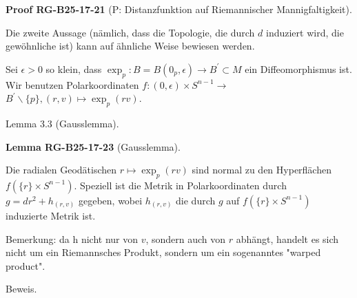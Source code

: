 \documentclass[10pt, letterpaper]{article}
\newcommand{\CustomHeading}[3]{%
  \par\medskip\noindent%
  \textbf{#1 #2} \textnormal{(#3)}.\enskip%
}
\newenvironment{LEM}[2]{\begin{unitbox}\CustomHeading{Lemma}{#1}{#2}}{\end{unitbox}}
\newenvironment{PROOF}[2]{\begin{unitbox}\CustomHeading{Proof}{#1}{#2}}{\end{unitbox}}
\begin{document}
\begin{PROOF}{RG-B25-17-21}{P: Distanzfunktion auf Riemannischer Mannigfaltigkeit}
Die zweite Aussage (nämlich, dass die Topologie, die durch $d$ induziert wird, die gewöhnliche ist) kann auf ähnliche Weise bewiesen werden.

Sei $\epsilon>0$ so klein, dass $\exp _{p}: B=B\left(0_{p}, \epsilon\right) \rightarrow B^{\prime} \subset M$ ein Diffeomorphismus ist. Wir benutzen Polarkoordinaten $f:(0, \epsilon) \times S^{n-1} \rightarrow$ $B^{\prime} \backslash\{p\},(r, v) \mapsto \exp _{p}(r v)$.
\end{PROOF}



Lemma 3.3 (Gausslemma). 


\begin{LEM}{RG-B25-17-23}{Gausslemma}
Die radialen Geodätischen $r \mapsto \exp _{p}(r v)$ sind normal zu den Hyperflächen $f\left(\{r\} \times S^{n-1}\right)$. Speziell ist die Metrik in Polarkoordinaten durch $g=d r^{2}+h_{(r, v)}$ gegeben, wobei $h_{(r, v)}$ die durch $g$ auf $f\left(\{r\} \times S^{n-1}\right)$ induzierte Metrik ist.
\end{LEM}

Bemerkung: da h nicht nur von $v$, sondern auch von $r$ abhängt, handelt es sich nicht um ein Riemannsches Produkt, sondern um ein sogenanntes "warped product".

Beweis. 
\end{document}
